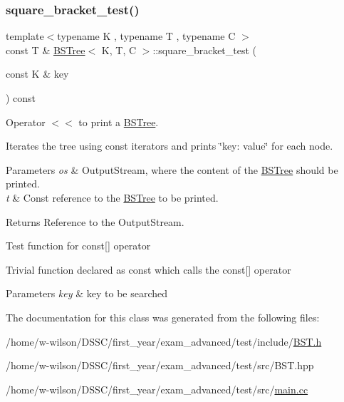 \subsubsection{\texorpdfstring{square\+\_\+bracket\+\_\+test()}{square\_bracket\_test()}}
{\footnotesize\ttfamily template$<$typename K , typename T , typename C $>$ \\
const T \& \hyperlink{class_b_s_tree}{B\+S\+Tree}$<$ K, T, C $>$\+::square\+\_\+bracket\+\_\+test (\begin{DoxyParamCaption}\item[{const K \&}]{key }\end{DoxyParamCaption}) const}



Operator $<$$<$ to print a \hyperlink{class_b_s_tree}{B\+S\+Tree}. 

Iterates the tree using const iterators and prints \char`\"{}key\+: value\char`\"{} for each node.


\begin{DoxyParams}{Parameters}
{\em os} & Output\+Stream, where the content of the \hyperlink{class_b_s_tree}{B\+S\+Tree} should be printed. \\
\hline
{\em t} & Const reference to the \hyperlink{class_b_s_tree}{B\+S\+Tree} to be printed. \\
\hline
\end{DoxyParams}
\begin{DoxyReturn}{Returns}
Reference to the Output\+Stream.
\end{DoxyReturn}
Test function for const\mbox{[}\mbox{]} operator

Trivial function declared as const which calls the const\mbox{[}\mbox{]} operator 
\begin{DoxyParams}{Parameters}
{\em key} & key to be searched \\
\hline
\end{DoxyParams}


The documentation for this class was generated from the following files\+:\begin{DoxyCompactItemize}
\item 
/home/w-\/wilson/\+D\+S\+S\+C/first\+\_\+year/exam\+\_\+advanced/test/include/\hyperlink{_b_s_t_8h}{B\+S\+T.\+h}\item 
/home/w-\/wilson/\+D\+S\+S\+C/first\+\_\+year/exam\+\_\+advanced/test/src/B\+S\+T.\+hpp\item 
/home/w-\/wilson/\+D\+S\+S\+C/first\+\_\+year/exam\+\_\+advanced/test/src/\hyperlink{main_8cc}{main.\+cc}\end{DoxyCompactItemize}
